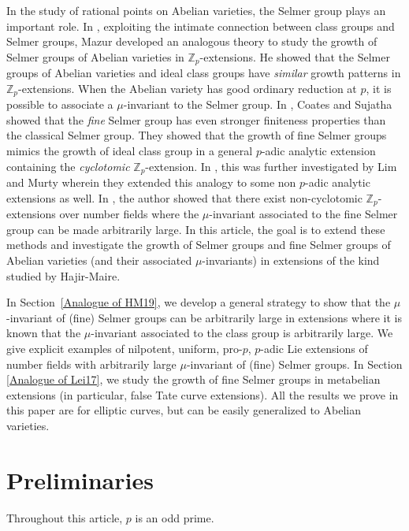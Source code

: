 \documentclass{amsart}
\newcommand{\ZZ}{\mathbb Z}
\theoremstyle{definition}
\theoremstyle{remark}
\begin{document}
In the study of rational points on Abelian varieties, the Selmer group plays an important role.
In \cite{Maz72}, exploiting the intimate connection between class groups and Selmer groups, Mazur developed an analogous theory to study the growth of Selmer groups of Abelian varieties in $\ZZ_p$-extensions.
He showed that the Selmer groups of Abelian varieties and ideal class groups have \textit{similar} growth patterns in $\ZZ_p$-extensions.
When the Abelian variety has good ordinary reduction at $p$, it is possible to associate a $\mu$-invariant to the Selmer group. 
In \cite{CS05}, Coates and Sujatha showed that the \textit{fine} Selmer group has even stronger finiteness properties than the classical Selmer group.
They showed that the growth of fine Selmer groups mimics the growth of ideal class group in a general $p$-adic analytic extension containing the \textit{cyclotomic} $\ZZ_p$-extension.
In \cite{LM15}, this was further investigated by Lim and Murty wherein they extended this analogy to some non $p$-adic analytic extensions as well.
In \cite{Kun20}, the author showed that there exist non-cyclotomic $\ZZ_p$-extensions over number fields where the $\mu$-invariant associated to the fine Selmer group can be made arbitrarily large.
In this article, the goal is to extend these methods and investigate the growth of Selmer groups and fine Selmer groups of Abelian varieties (and their associated $\mu$-invariants) in extensions of the kind studied by Hajir-Maire.

In Section~\ref{Analogue of HM19}, we develop a general strategy to show that the $\mu$-invariant of (fine) Selmer groups can be arbitrarily large in extensions where it is known that the $\mu$-invariant associated to the class group is arbitrarily large.
We give explicit examples of nilpotent, uniform, pro-$p$, $p$-adic Lie extensions of number fields with arbitrarily large $\mu$-invariant of (fine) Selmer groups.
In Section \ref{Analogue of Lei17}, we study the growth of fine Selmer groups in metabelian extensions (in particular, false Tate curve extensions).
All the results we prove in this paper are for elliptic curves, but can be easily generalized to Abelian varieties.

\section{Preliminaries} \label{Preliminaries}

Throughout this article, $p$ is an odd prime.
\end{document}

